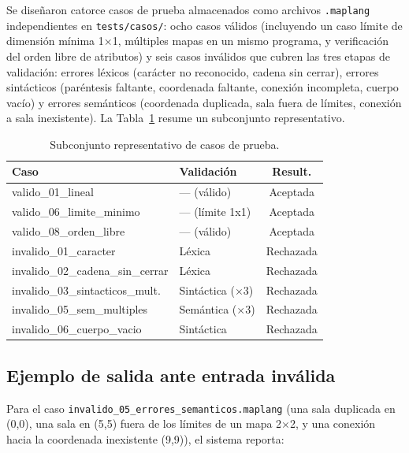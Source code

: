 \documentclass[10pt,twocolumn]{article}
\begin{document}
Se diseñaron catorce casos de prueba almacenados como archivos
\texttt{.maplang} independientes en \texttt{tests/casos/}: ocho casos
válidos (incluyendo un caso límite de dimensión mínima 1×1, múltiples
mapas en un mismo programa, y verificación del orden libre de atributos) y
seis casos inválidos que cubren las tres etapas de validación: errores
léxicos (carácter no reconocido, cadena sin cerrar), errores sintácticos
(paréntesis faltante, coordenada faltante, conexión incompleta, cuerpo
vacío) y errores semánticos (coordenada duplicada, sala fuera de límites,
conexión a sala inexistente). La Tabla~\ref{tab:casos} resume un
subconjunto representativo.

\begin{table}[t]
\centering
\caption{Subconjunto representativo de casos de prueba.}
\label{tab:casos}
\scriptsize
\begin{tabularx}{\linewidth}{X l c}
\toprule
\textbf{Caso} & \textbf{Validación} & \textbf{Result.} \\
\midrule
valido\_01\_lineal           & --- (válido)       & Aceptada \\
valido\_06\_limite\_minimo     & --- (límite 1x1)     & Aceptada \\
valido\_08\_orden\_libre        & --- (válido)           & Aceptada \\
invalido\_01\_caracter           & Léxica                  & Rechazada \\
invalido\_02\_cadena\_sin\_cerrar  & Léxica                    & Rechazada \\
invalido\_03\_sintacticos\_mult.    & Sintáctica (×3)             & Rechazada \\
invalido\_05\_sem\_multiples         & Semántica (×3)                & Rechazada \\
invalido\_06\_cuerpo\_vacio            & Sintáctica                       & Rechazada \\
\bottomrule
\end{tabularx}
\end{table}

\subsection{Ejemplo de salida ante entrada inválida}

Para el caso \texttt{invalido\_05\_\allowbreak errores\_\allowbreak semanticos.maplang}
(una sala duplicada en (0,0), una sala en (5,5) fuera de los límites de un
mapa 2$\times$2, y una conexión hacia la coordenada inexistente (9,9)), el
sistema reporta:
\end{document}
